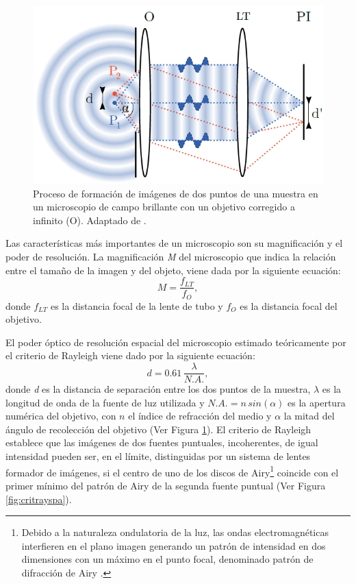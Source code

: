 \begin{figure}
	\centering
	\includegraphics[width=1.0\textwidth]{Figs/introduccion/martinbordenave.png}
	\caption{Proceso de formación de imágenes de dos puntos de una muestra en un microscopio de campo brillante con un objetivo corregido a infinito (O). Adaptado de \cite{borden}.}
	\label{fig:mdb}
\end{figure}

Las características más importantes de un microscopio son su magnificación y el poder de resolución. La magnificación \textit{M} del microscopio que indica la relación entre el tamaño de la imagen y del objeto, viene dada por la siguiente ecuación:
\begin{equation}
M = \frac{f_{LT}}{f_{O}},
\end{equation}	
donde $f_{LT}$ es la distancia focal de la lente de tubo y $f_{O}$ es la distancia focal del objetivo.

El poder óptico de resolución espacial del microscopio estimado teóricamente por el criterio de Rayleigh viene dado por la siguiente ecuación:
\begin{equation}
d = 0.61\hspace{2pt}\frac{\lambda}{ N.A.},
\end{equation}
donde \textit{d} es la distancia de separación entre los dos puntos de la muestra, $\lambda$ es la longitud de onda de la fuente de luz utilizada y $N.A. = n \hspace{2pt} sin(\alpha)$ es la apertura numérica del objetivo, con $n$ el índice de refracción del medio y $\alpha$ la mitad del ángulo de recolección del objetivo (Ver Figura \ref{fig:mdb}). El criterio de Rayleigh establece que las imágenes de dos fuentes puntuales, incoherentes, de igual intensidad pueden ser, en el límite, distinguidas por un sistema de lentes formador de imágenes, si el centro de uno de los discos de Airy\footnote{Debido a la naturaleza ondulatoria de la luz, las ondas
electromagnéticas interfieren en el plano imagen generando un patrón de intensidad en dos dimensiones con
un máximo en el punto focal, denominado patrón de difracción de Airy \cite{hecht2012optics}.} coincide con el primer mínimo del patrón de Airy de la segunda fuente puntual (Ver Figura \ref{fig:critrayspa}).

